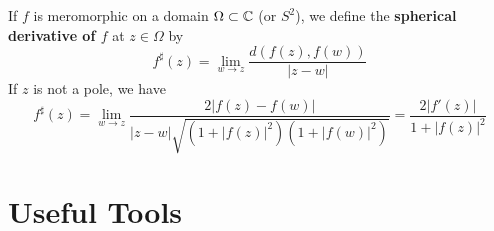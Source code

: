 \documentclass{article}
\begin{document}
\begin{definition}
  If \(f\) is meromorphic on a domain \(\Omega \subset \mathbb{C}\) (or \(S^2\)), we define the \textbf{spherical derivative of \(f\)} at \(z \in \Omega\) by
  \begin{equation}
    f^\sharp(z) = \lim_{w \to z}\frac{d(f(z), f(w))}{|z - w|}
  \end{equation}
  If \(z\) is not a pole, we have
  \begin{equation}
    f^\sharp(z)
    = \lim_{w \to z}
      \frac{2|f(z) - f(w)|}{|z - w|\sqrt{(1 + |f(z)|^2)(1 + |f(w)|^2)}}
    = \frac{2|f'(z)|}{1 + |f(z)|^2}
  \end{equation}
\end{definition}

\section{Useful Tools}
\end{document}
